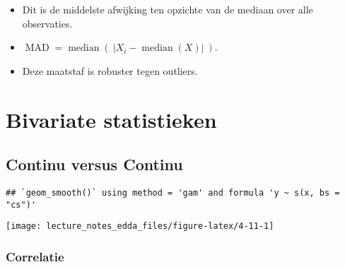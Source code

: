 \documentclass[]{memoir}
\providecommand{\tightlist}{%
  \setlength{\itemsep}{0pt}\setlength{\parskip}{0pt}}
\begin{document}
\begin{itemize}
  \begin{itemize}
  \tightlist
  \item
    Dit is de middelste afwijking ten opzichte van de mediaan over alle observaties.
  \item
    \(\operatorname{MAD} = \operatorname{median}\left(\ \left| X_{i} - \operatorname{median} (X) \right|\ \right)\).
  \item
    Deze maatstaf is robuster tegen outliers.
  \end{itemize}
\end{itemize}

\begin{table}[t]

\caption{\label{tab:4-10}Afstand (spreidingsmaten)}
\centering
{}
\end{table}

\hypertarget{bivariate-statistieken}{%
\section{Bivariate statistieken}\label{bivariate-statistieken}}

\hypertarget{continu-versus-continu}{%
\subsection{Continu versus Continu}\label{continu-versus-continu}}

\begin{verbatim}
## `geom_smooth()` using method = 'gam' and formula 'y ~ s(x, bs = "cs")'
\end{verbatim}

\texttt{[image: lecture\_notes\_edda\_files/figure-latex/4-11-1]}

\hypertarget{correlatie}{%
\subsubsection*{Correlatie}\label{correlatie}}
\end{document}
